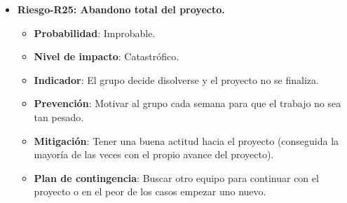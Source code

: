 \begin{itemize}
\begin{itemize}
		\end{itemize}
\item { \bf Riesgo-R25: Abandono total del proyecto.}
		\begin{itemize}	
		\item{ \bf Probabilidad}: Improbable.
		\item{ \bf Nivel de impacto}: Catastrófico.
		\item{ \bf Indicador}: El grupo decide disolverse y el proyecto no se finaliza.
		\item{ \bf Prevención}: Motivar al grupo cada semana para que el trabajo no sea tan pesado.
		\item{ \bf Mitigación}: Tener una buena actitud hacia el proyecto (conseguida la mayoría de las veces con el propio avance del proyecto). 
		\item{ \bf Plan de contingencia}: Buscar otro equipo para continuar con el proyecto o en el peor de los casos empezar uno nuevo.\\
		\end{itemize}
\end{itemize}